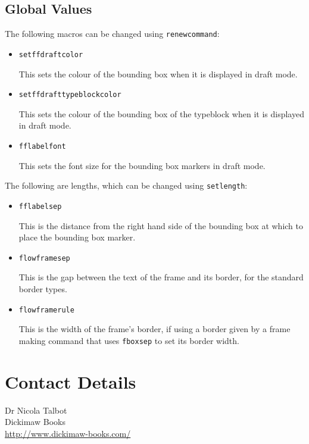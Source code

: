 \documentclass[a4paper]{article}
\newcommand{\cmdname}[1]{\texttt{\symbol{92}#1}}
\begin{document}
\subsection{Global Values}

The following macros can be changed using \cmdname{renewcommand}:

\begin{itemize}
\item \cmdname{setffdraftcolor} 

This sets the colour of the bounding box
when it is displayed in draft mode.

\item 
\cmdname{setffdrafttypeblockcolor} 

This sets the colour of
the bounding box of the typeblock when it is displayed
in draft mode.

\item \cmdname{fflabelfont}

This sets the font size for the bounding box markers in 
draft mode.

\end{itemize}

The following are lengths, which can be changed using
\cmdname{setlength}:

\begin{itemize}
\item \cmdname{fflabelsep}

This is the distance from the right hand side of the
bounding box at which to place the bounding box marker.

\item \cmdname{flowframesep}

This is the gap between the text of the frame and
its border, for the standard border types. 

\item \cmdname{flowframerule}

This is the width of the frame's border, if using
a border given by a frame making command that uses \cmdname{fboxsep}
to set its border width.
\end{itemize}


\section*{Contact Details}

Dr Nicola Talbot\\
Dickimaw Books\\
\url{http://www.dickimaw-books.com/}
\end{document}
